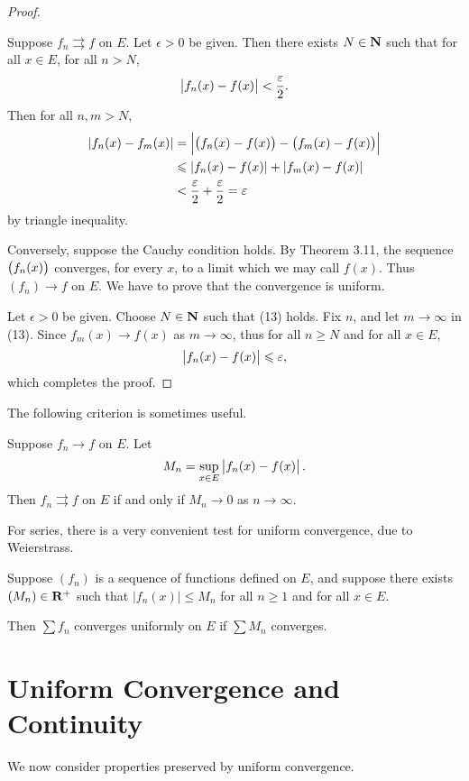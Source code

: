 \begin{proof} \

\fbox{$\implies$} Suppose $f_n\rightrightarrows f$ on $E$. Let $\epsilon>0$ be given. Then there exists $N\in\mathbf N$ such that for all $x\in E$, for all $n>N$,
\[\left|f_n(x)-f(x)\right|<\frac{\varepsilon}{2}.\]
Then for all $n,m>N$,
\begin{align*}
|f_n(x)-f_m(x)|
&=\left|\left(f_n(x)-f(x)\right)-\left(f_m(x)-f(x)\right)\right|\\
&\leqslant|f_n(x)-f(x)|+|f_m(x)-f(x)|\\
&<\frac{\varepsilon}{2}+\frac{\varepsilon}{2}=\varepsilon
\end{align*}
by triangle inequality.

\fbox{$\impliedby$} Conversely, suppose the Cauchy condition holds. By Theorem 3.11, the sequence $\left(f_n(x)\right)$ converges, for every $x$, to a limit which we may call $f(x)$. Thus $(f_n)\to f$ on $E$. We have to prove that the convergence is uniform.

Let $\epsilon>0$ be given. Choose $N\in\mathbf N$ such that (13) holds. Fix $n$, and let $m\to\infty$ in (13). Since $f_m(x)\to f(x)$ as $m\to\infty$, thus for all $n\ge N$ and for all $x\in E$,
\[\left|f_n(x)-f(x)\right|\leqslant\varepsilon,\]
which completes the proof.
\end{proof}

The following criterion is sometimes useful.

\begin{proposition}
Suppose $f_n\to f$ on $E$. Let
\[M_n=\sup_{x\in E}\left|f_n(x)-f(x)\right|.\]
Then $f_n\rightrightarrows f$ on $E$ if and only if $M_n\to0$ as $n\to\infty$.
\end{proposition}

For series, there is a very convenient test for uniform convergence, due to Weierstrass.

\begin{lemma}
Suppose $(f_n)$ is a sequence of functions defined on $E$, and suppose there exists $(M_n)\in\mathbf R^+$ such that $|f_n(x)|\le M_n$ for all $n\ge1$ and for all $x\in E$.

Then $\sum f_n$ converges uniformly on $E$ if $\sum M_n$ converges.
\end{lemma}

\section{Uniform Convergence and Continuity}
We now consider properties preserved by uniform convergence.

